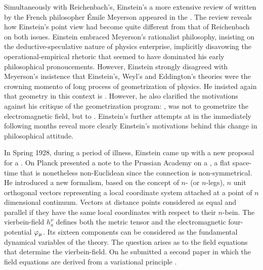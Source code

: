 \documentclass[draft]{article}
\renewcommand{\me}{;~m.e.{}}
\newcommand{\nbein}{$n$-bein\xspace}
\newcommand{\vbein}{vierbein\xspace}
\newcommand{\hbein}{\ensuremath{h_{a}^{\nu}}\xspace}
\begin{document}
Simultaneously with Reichenbach's, Einstein's a more extensive review of  written by the French philosopher \'Emile Meyerson \citep{Meyerson1925} appeared in the \citet{Einstein1928b}. The review reveals how Einstein's point view had become quite different from that of Reichenbach on both issues. Einstein embraced Meyerson's rationalist philosophy, insisting on the deductive-speculative nature of physics enterprise, implicitly disavowing the operational-empirical rhetoric that seemed to have dominated his early philosophical pronoucements. However, Einstein strongly disagreed with Meyerson's insistence that Einstein's, Weyl's and Eddington's theories were the crowning momento of long process of geometrization of physics. He insisted again that geometry in this context is  \citep[165\me]{Einstein1928b}. However, he also clarified the motivations against his critique of the geometrization program: , was not to geometrize the electromagnetic field, but to  \citep[165\me]{Einstein1928b}. Einstein's further attempts at \uft in the immediately following months reveal more clearly Einstein's motivations behind this change in philosophical attitude.


In Spring 1928, during a period of illness, Einstein came up with a new proposal for a \uft. On  Planck presented a note to the Prussian Academy on a  \citep{Einstein19281}, a flat space-time that is nonetheless non-Euclidean since the connection \Gtmn is non-symmetrical. He introduced a new formalism, based on the concept of $n$- (or $n$-legs), $n$ unit orthogonal vectors representing a local coordinate system attached at a point of $n$ dimensional continuum. Vectors at distance points considered as equal and parallel if they have the same local coordinates with respect to their \nbein. The \vbein-field \hbein defines both the metric tensor \gmn and the electromagnetic four-potential $\varphi_{\mu}$. Its sixteen components can be considered as the fundamental dynamical variables of the theory. The question arises as to the field equations that determine the \vbein-field. On  he submitted a second paper in which the field equations are derived from a variational principle \citep{Einstein19282}.
\end{document}
